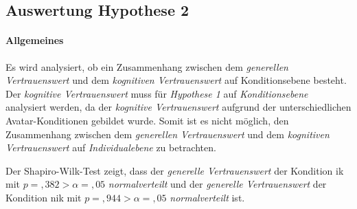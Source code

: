 \documentclass[a4paper,11pt]{article}%
\renewcommand{\\}{\vspace*{0.5\baselineskip} \newline}
\begin{document}
{\newpage
\subsection{Auswertung Hypothese 2}
\label{Auswertung Hypothese 2}

\paragraph{Allgemeines}
Es wird analysiert, ob ein Zusammenhang zwischen dem \textit{generellen Vertrauenswert} und dem \textit{kognitiven Vertrauenswert} auf Konditionsebene besteht.\\
Der \textit{kognitive Vertrauenswert} muss für \textit{Hypothese 1} auf \textit{Konditionsebene} analysiert werden, da der \textit{kognitive Vertrauenswert} aufgrund der unterschiedlichen Avatar-Konditionen gebildet wurde. Somit ist es nicht möglich, den Zusammenhang zwischen dem \textit{generellen Vertrauenswert} und dem \textit{kognitiven Vertrauenswert} auf \textit{Individualebene} zu betrachten.

Der Shapiro-Wilk-Test zeigt, dass der \textit{generelle Vertrauenswert} der Kondition \ac{ik} mit $p =,382 > \alpha =,05$ \textit{normalverteilt} und der \textit{generelle Vertrauenswert} der Kondition \newline \ac{nik} mit $p =,944 > \alpha =,05$ \textit{normalverteilt} ist.

}
\end{document}

